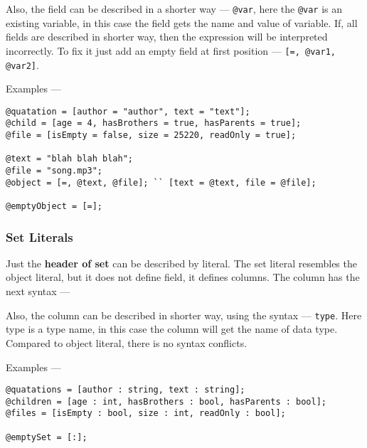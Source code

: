 Also, the field can be described in a shorter way — \texttt{@var}, here the \texttt{@var} is an existing variable, in this case the field gets the name and value of variable. If, all fields are described in shorter way, then the expression will be interpreted incorrectly. To fix it just add an empty field at first position — \texttt{[=, @var1, @var2]}.

Examples —
\begin{verbatim}
@quatation = [author = "author", text = "text"];
@child = [age = 4, hasBrothers = true, hasParents = true];
@file = [isEmpty = false, size = 25220, readOnly = true];

@text = "blah blah blah";
@file = "song.mp3";
@object = [=, @text, @file]; `` [text = @text, file = @file];

@emptyObject = [=];
\end{verbatim}

\subsubsection{Set Literals}

Just the {\bf header of set} can be described by literal. The set literal resembles the object literal, but it does not define field, it defines columns. The column has the next syntax —

Also, the column can be described in shorter way, using the syntax — \texttt{type}. Here type is a type name, in this case the column will get the name of data type. Compared to object literal, there is no syntax conflicts.

Examples —
\begin{verbatim}
@quatations = [author : string, text : string];
@children = [age : int, hasBrothers : bool, hasParents : bool];
@files = [isEmpty : bool, size : int, readOnly : bool];

@emptySet = [:];
\end{verbatim}
